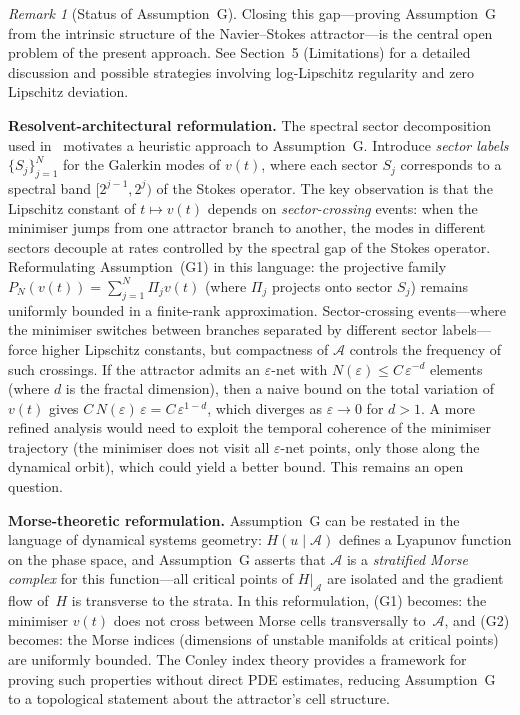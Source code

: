 \documentclass[12pt,a4paper]{article}
\theoremstyle{definition}
\theoremstyle{plain}
\theoremstyle{remark}
\newtheorem{remark}[definition]{Remark}
\begin{document}
\begin{remark}[Status of Assumption~G]
Closing this gap---proving Assumption~G from the intrinsic structure of the
Navier--Stokes attractor---is the central open problem of the present approach.
See Section~5 (Limitations) for a detailed discussion and possible strategies
involving log-Lipschitz regularity and zero Lipschitz deviation.

\medskip\noindent
\textbf{Resolvent-architectural reformulation.}\;
The spectral sector decomposition used in~\cite{GeigerRH2026c}
motivates a heuristic approach to Assumption~G. Introduce \emph{sector labels}
$\{S_j\}_{j=1}^{N}$ for the Galerkin modes of $v(t)$, where each sector
$S_j$ corresponds to a spectral band $[2^{j-1}, 2^j)$ of the Stokes
operator. The key observation is that the Lipschitz constant of
$t \mapsto v(t)$ depends on \emph{sector-crossing} events: when the
minimiser jumps from one attractor branch to another, the modes in
different sectors decouple at rates controlled by the spectral gap of
the Stokes operator. Reformulating Assumption~(G1) in this language:
the projective family $P_N(v(t)) = \sum_{j=1}^{N} \Pi_j v(t)$ (where
$\Pi_j$ projects onto sector $S_j$) remains uniformly bounded in a
finite-rank approximation. Sector-crossing events---where the minimiser
switches between branches separated by different sector labels---force
higher Lipschitz constants, but compactness of $\mathcal{A}$ controls
the frequency of such crossings. If the attractor admits an
$\varepsilon$-net with $N(\varepsilon) \leq C\,\varepsilon^{-d}$
elements (where $d$ is the fractal dimension), then a naive bound on
the total variation of $v(t)$ gives
$C\,N(\varepsilon)\,\varepsilon = C\,\varepsilon^{1-d}$, which
diverges as $\varepsilon \to 0$ for $d > 1$.  A more refined analysis
would need to exploit the temporal coherence of the minimiser trajectory
(the minimiser does not visit all $\varepsilon$-net points, only those
along the dynamical orbit), which could yield a better bound.
This remains an open question.

\medskip\noindent
\textbf{Morse-theoretic reformulation.}\;
Assumption~G can be restated in the language of dynamical systems
geometry: $H(u \mid \mathcal{A})$ defines a Lyapunov function on the
phase space, and Assumption~G asserts that $\mathcal{A}$ is a
\emph{stratified Morse complex} for this function---all critical
points of $H|_{\mathcal{A}}$ are isolated and the gradient flow of~$H$
is transverse to the strata. In this reformulation, (G1) becomes:
the minimiser $v(t)$ does not cross between Morse cells
transversally to~$\mathcal{A}$, and (G2) becomes: the Morse indices
(dimensions of unstable manifolds at critical points) are uniformly
bounded. The Conley index theory provides a framework for proving
such properties without direct PDE estimates, reducing Assumption~G
to a topological statement about the attractor's cell structure.


\end{remark}
\end{document}
